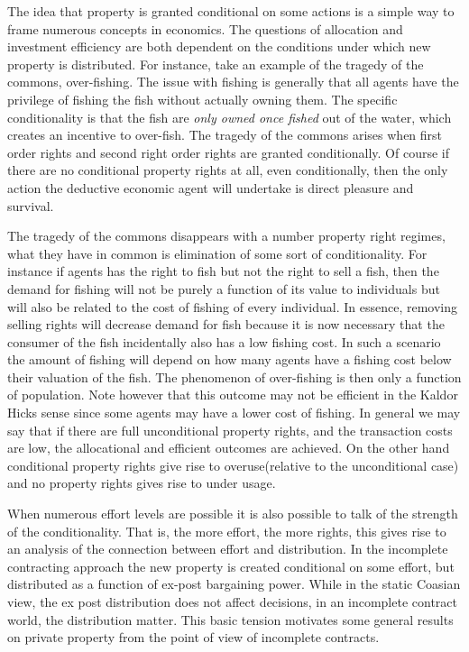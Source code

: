 \documentclass[12pt]{article}
\numberwithin{equation}{section}
\begin{document}
The idea that property is granted conditional on some actions is a simple way to frame numerous concepts in economics. The questions of allocation and investment efficiency are both dependent on the conditions under which new property is distributed. For instance, take an example of the tragedy of the commons, over-fishing. The issue with fishing is generally that all agents have the privilege of fishing the fish without actually owning them. The specific conditionality is that the fish are \textit{only owned once fished} out of the water, which creates an incentive to over-fish. The tragedy of the commons arises when first order rights and second right order rights are granted conditionally. Of course if there are no conditional property rights at all, even conditionally, then the only action the deductive economic agent will undertake is direct pleasure and survival.

The tragedy of the commons disappears with a number property right regimes, what they have in common is elimination of some sort of conditionality. For instance if agents has the right to fish but not the right to sell a fish, then the demand for fishing will not be purely a function of its value to individuals but will also be related to the cost of fishing of every individual. In essence, removing selling rights will decrease demand for fish because it is now necessary  that the consumer of the fish incidentally also has a low fishing cost. In such a scenario the amount of fishing will depend on how many agents have a fishing cost below their valuation of the fish. The phenomenon of over-fishing is then only a function of population. Note however that this outcome may not be efficient in the Kaldor Hicks sense since some agents may have a lower cost of fishing.  In general we may say that if there are full unconditional property rights, and the transaction costs are low, the allocational and efficient outcomes are achieved. On the other hand conditional property rights give rise to overuse(relative to the unconditional case) and no property rights gives rise to under usage.

When numerous effort levels are possible it is also possible to talk of the strength of the conditionality. That is, the more effort, the more rights, this gives rise to an analysis of the connection between effort and distribution. In the incomplete contracting approach the new property is created conditional on some effort, but distributed as a function of ex-post bargaining power. While in the static Coasian view, the ex post distribution does not affect decisions, in an incomplete contract world, the distribution matter. This basic tension motivates some general results on private property from the point of view of incomplete contracts.
\end{document}
